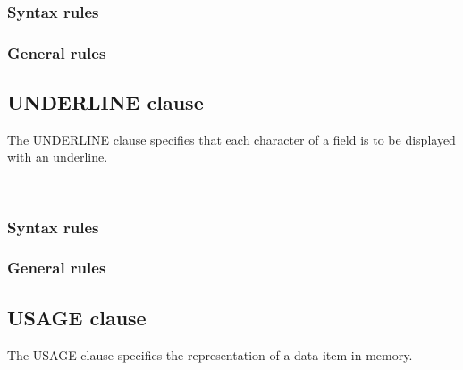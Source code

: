 \subsubsection{Syntax rules}

\subsubsection{General rules}

\subsection{UNDERLINE clause}

The UNDERLINE clause specifies that each character of a field is to be displayed with an underline.

\begin{syntax}
  \begin{1=}
     \\
  \end{1=}
\end{syntax}

\subsubsection{Syntax rules}

\subsubsection{General rules}

\subsection{USAGE clause}

The USAGE clause specifies the representation of a data item in memory.

